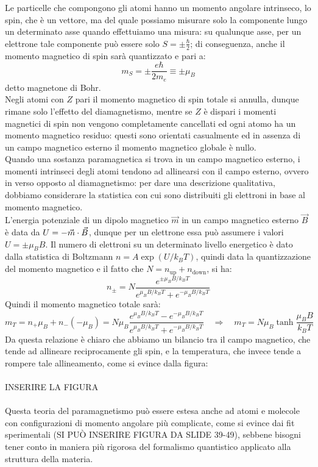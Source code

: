 \documentclass[]{article}
\begin{document}
Le particelle che compongono gli atomi hanno un momento angolare intrinseco, lo spin, che è un vettore, ma del quale possiamo misurare solo la componente lungo un determinato asse quando effettuiamo una misura: su qualunque asse, per un elettrone tale componente può essere solo $ S = \pm\frac{\hbar}{2} $; di conseguenza, anche il momento magnetico di spin sarà quantizzato e pari a:
\begin{equation}
	m_S = \pm\frac{e\hbar}{2m_e} \equiv \pm\mu_B
	\label{eq:9}
\end{equation}
detto magnetone di Bohr. \\ 
%
Negli atomi con $ Z $ pari il momento magnetico di spin totale si annulla, dunque rimane solo l'effetto del diamagnetismo, mentre se $ Z $ è dispari i momenti magnetici di spin non vengono completamente cancellati ed ogni atomo ha un momento magnetico residuo: questi sono orientati casualmente ed in assenza di un campo magnetico esterno il momento magnetico globale è nullo. \\ 
%
Quando una sostanza paramagnetica si trova in un campo magnetico esterno, i momenti intrinseci degli atomi tendono ad allinearsi con il campo esterno, ovvero in verso opposto al diamagnetismo: per dare una descrizione qualitativa, dobbiamo considerare la statistica con cui sono distribuiti gli elettroni in base al momento magnetico. \\ 
%
L'energia potenziale di un dipolo magnetico $ \vec{m} $ in un campo magnetico esterno $ \vec{B} $ è data da $ U = - \vec{m}\cdot\vec{B} $, dunque per un elettrone essa può assumere i valori $ U = \pm\mu_B B $. Il numero di elettroni su un determinato livello energetico è dato dalla statistica di Boltzmann $ n = A \exp(U/k_B T) $, quindi data la quantizzazione del momento magnetico e il fatto che $ N = n_{\text{up}} + n_{\text{down}} $, si ha:
\begin{equation}
	n_{\pm} = N \frac{e^{\pm\mu_B B / k_B T}}{e^{\mu_B B / k_B T} + e^{-\mu_B B / k_B T}}
	\label{eq:10}
\end{equation}
Quindi il momento magnetico totale sarà:
\begin{equation}
	m_T = n_+ \mu_B + n_- (-\mu_B) = N\mu_B \frac{e^{\mu_B B / k_B T} - e^{-\mu_B B / k_B T}}{e^{\mu_B B / k_B T} + e^{-\mu_B B / k_B T}} \quad\Longrightarrow\quad m_T = N\mu_B \tanh\frac{\mu_B B}{k_B T}
	\label{eq:11}
\end{equation}
Da questa relazione è chiaro che abbiamo un bilancio tra il campo magnetico, che tende ad allineare reciprocamente gli spin, e la temperatura, che invece tende a rompere tale allineamento, come si evince dalla figura: \\ 
%
%
%
\hbox{}\\ INSERIRE LA FIGURA\\ \hbox{}\\ 
%
%
%
Questa teoria del paramagnetismo può essere estesa anche ad atomi e molecole con configurazioni di momento angolare più complicate, come si evince dai fit sperimentali (SI PUÒ INSERIRE FIGURA DA SLIDE 39-49), sebbene bisogni tener conto in maniera più rigorosa del formalismo quantistico applicato alla struttura della materia.
\end{document}

